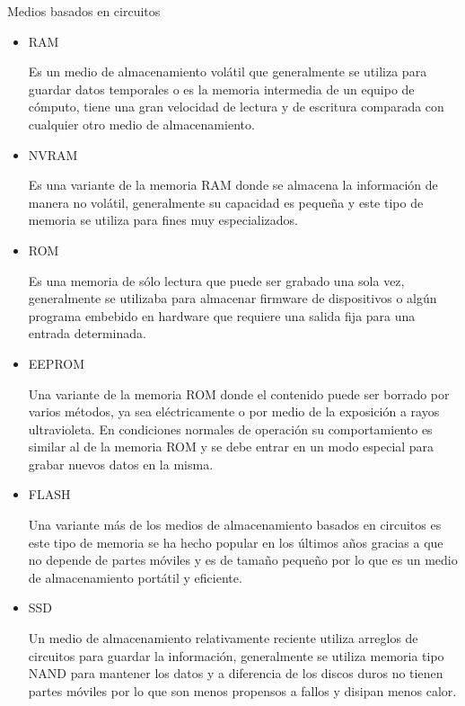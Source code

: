 %
%
%
Medios basados en circuitos
\begin{itemize}
  \item RAM
  
  Es un medio de almacenamiento vol\'{a}til que generalmente se utiliza para guardar datos temporales o es la memoria intermedia de un equipo de c\'{o}mputo, tiene una gran velocidad de lectura y de escritura comparada con cualquier otro medio de almacenamiento.
  
  \item NVRAM
  
  Es una variante de la memoria RAM donde se almacena la informaci\'{o}n de manera no vol\'{a}til, generalmente su capacidad es peque\~{n}a y este tipo de memoria se utiliza para fines muy especializados.
  
  \item ROM
  
  Es una memoria de s\'{o}lo lectura que puede ser grabado una sola vez, generalmente se utilizaba para almacenar firmware de dispositivos o alg\'{u}n programa embebido en hardware que requiere una salida fija para una entrada determinada.
  
  \item EEPROM
  
  Una variante de la memoria ROM donde el contenido puede ser borrado por varios m\'{e}todos, ya sea el\'{e}ctricamente o por medio de la exposici\'{o}n a rayos ultravioleta. En condiciones normales de operaci\'{o}n su comportamiento es similar al de la memoria ROM y se debe entrar en un modo especial para grabar nuevos datos en la misma.
  
  \item FLASH
  
  Una variante m\'{a}s de los medios de almacenamiento basados en circuitos es este tipo de memoria se ha hecho popular en los \'{u}ltimos a\~{n}os gracias a que no depende de partes m\'{o}viles y es de tama\~{n}o peque\~{n}o por lo que es un medio de almacenamiento port\'{a}til y eficiente.
  
  \item SSD
  
  Un medio de almacenamiento relativamente reciente utiliza arreglos de circuitos para guardar la informaci\'{o}n, generalmente se utiliza memoria tipo NAND para mantener los datos y a diferencia de los discos duros no tienen partes m\'{o}viles por lo que son menos propensos a fallos y disipan menos calor.
  
\end{itemize}
